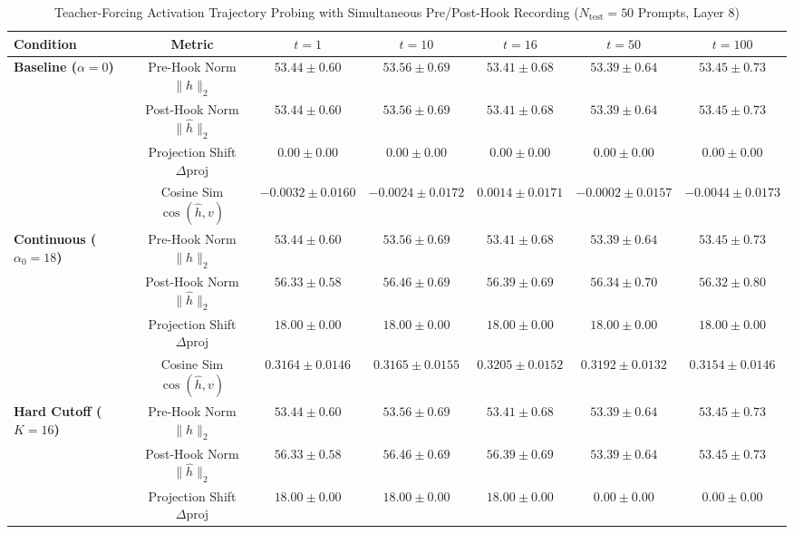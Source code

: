 \documentclass[conference]{IEEEtran}
\begin{document}
\begin{table}[htbp]
\caption{Teacher-Forcing Activation Trajectory Probing with Simultaneous Pre/Post-Hook Recording ($N_{\text{test}}=50$ Prompts, Layer 8)}
\label{tab:activation_trajectories}
\centering
\small
\setlength{\tabcolsep}{3pt}
\begin{tabular}{lcccccc}
\toprule
\textbf{Condition} & \textbf{Metric} & \textbf{$t=1$} & \textbf{$t=10$} & \textbf{$t=16$} & \textbf{$t=50$} & \textbf{$t=100$} \\
\midrule
\multirow{4}{*}{\textbf{Baseline ($\alpha=0$)}} 
 & Pre-Hook Norm $\|h\|_2$ & $53.44 \pm 0.60$ & $53.56 \pm 0.69$ & $53.41 \pm 0.68$ & $53.39 \pm 0.64$ & $53.45 \pm 0.73$ \\
 & Post-Hook Norm $\|\hat{h}\|_2$ & $53.44 \pm 0.60$ & $53.56 \pm 0.69$ & $53.41 \pm 0.68$ & $53.39 \pm 0.64$ & $53.45 \pm 0.73$ \\
 & Projection Shift $\Delta \text{proj}$ & $0.00 \pm 0.00$ & $0.00 \pm 0.00$ & $0.00 \pm 0.00$ & $0.00 \pm 0.00$ & $0.00 \pm 0.00$ \\
 & Cosine Sim $\cos(\hat{h}, v)$ & $-0.0032 \pm 0.0160$ & $-0.0024 \pm 0.0172$ & $0.0014 \pm 0.0171$ & $-0.0002 \pm 0.0157$ & $-0.0044 \pm 0.0173$ \\
\midrule
\multirow{4}{*}{\textbf{Continuous ($\alpha_0=18$)}} 
 & Pre-Hook Norm $\|h\|_2$ & $53.44 \pm 0.60$ & $53.56 \pm 0.69$ & $53.41 \pm 0.68$ & $53.39 \pm 0.64$ & $53.45 \pm 0.73$ \\
 & Post-Hook Norm $\|\hat{h}\|_2$ & $56.33 \pm 0.58$ & $56.46 \pm 0.69$ & $56.39 \pm 0.69$ & $56.34 \pm 0.70$ & $56.32 \pm 0.80$ \\
 & Projection Shift $\Delta \text{proj}$ & $18.00 \pm 0.00$ & $18.00 \pm 0.00$ & $18.00 \pm 0.00$ & $18.00 \pm 0.00$ & $18.00 \pm 0.00$ \\
 & Cosine Sim $\cos(\hat{h}, v)$ & $0.3164 \pm 0.0146$ & $0.3165 \pm 0.0155$ & $0.3205 \pm 0.0152$ & $0.3192 \pm 0.0132$ & $0.3154 \pm 0.0146$ \\
\midrule
\multirow{4}{*}{\textbf{Hard Cutoff ($K=16$)}} 
 & Pre-Hook Norm $\|h\|_2$ & $53.44 \pm 0.60$ & $53.56 \pm 0.69$ & $53.41 \pm 0.68$ & $53.39 \pm 0.64$ & $53.45 \pm 0.73$ \\
 & Post-Hook Norm $\|\hat{h}\|_2$ & $56.33 \pm 0.58$ & $56.46 \pm 0.69$ & $56.39 \pm 0.69$ & $53.39 \pm 0.64$ & $53.45 \pm 0.73$ \\
 & Projection Shift $\Delta \text{proj}$ & $18.00 \pm 0.00$ & $18.00 \pm 0.00$ & $18.00 \pm 0.00$ & $0.00 \pm 0.00$ & $0.00 \pm 0.00$ \\

\end{tabular}
\end{table}
\end{document}
